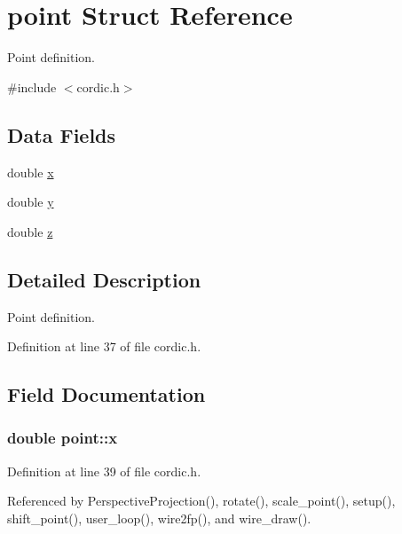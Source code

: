 \hypertarget{structpoint}{}\section{point Struct Reference}
\label{structpoint}


Point definition.  




{\ttfamily \#include $<$cordic.\+h$>$}

\subsection*{Data Fields}
\begin{DoxyCompactItemize}
\item 
double \hyperlink{structpoint_a9c6b34deaf4900ad4193c17935fd384a}{x}
\item 
double \hyperlink{structpoint_a613f8f0d7352731638b0094e1b958b87}{y}
\item 
double \hyperlink{structpoint_aab1f0c3682401083b5bf252e7001874f}{z}
\end{DoxyCompactItemize}


\subsection{Detailed Description}
Point definition. 

Definition at line 37 of file cordic.\+h.



\subsection{Field Documentation}
\subsubsection[{\texorpdfstring{x}{x}}]{\setlength{\rightskip}{0pt plus 5cm}double point\+::x}\hypertarget{structpoint_a9c6b34deaf4900ad4193c17935fd384a}{}\label{structpoint_a9c6b34deaf4900ad4193c17935fd384a}


Definition at line 39 of file cordic.\+h.



Referenced by Perspective\+Projection(), rotate(), scale\+\_\+point(), setup(), shift\+\_\+point(), user\+\_\+loop(), wire2fp(), and wire\+\_\+draw().

